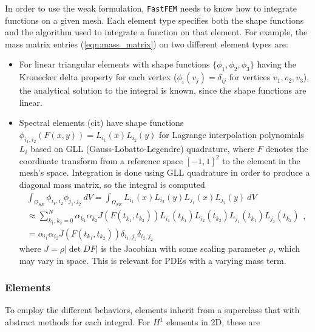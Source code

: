 In order to use the weak formulation, \texttt{FastFEM} needs to know how to integrate functions on a given mesh. Each element type specifies both the shape functions and the algorithm used to integrate a function on that element. For example, the mass matrix entries (\ref{eqn:mass_matrix}) on two different element types are:

\begin{itemize}
\item For linear triangular elements with shape functions $\{\phi_1,\phi_2,\phi_3\}$ having the Kronecker delta property for each vertex ($\phi_i(v_j) = \delta_{ij}$ for vertices $v_1,v_2,v_3$), the analytical solution to the integral is known, since the shape functions are linear.

\item Spectral elements (cit) have shape functions $\phi_{i_1,i_2}(F(x,y)) = L_{i_1}(x)L_{i_2}(y)$ for Lagrange interpolation polynomials $L_i$ based on GLL (Gauss-Lobatto-Legendre) quadrature, where $F$ denotes the coordinate transform from a reference space $[-1,1]^2$ to the element in the mesh's space. Integration is done using GLL quadrature in order to produce a diagonal mass matrix, so the integral is computed
\begin{equation}
\begin{aligned}
    \int_{\Omega_{SE}} \phi_{i_1,i_2}\phi_{j_1,j_2} ~dV = \int_{\Omega_{SE}} L_{i_1}(x)L_{i_2}(y)L_{j_1}(x)L_{j_2}(y) ~dV \\
    \approx \sum_{k_1,k_2=0}^N \alpha_{k_1}\alpha_{k_2} J(F(t_{k_1},t_{k_2}))L_{i_1}(t_{k_1})L_{i_2}(t_{k_2})L_{j_1}(t_{k_1})L_{j_2}(t_{k_2}) \\
    = \alpha_{i_1}\alpha_{i_2}J(F(t_{k_1},t_{k_2}))\delta_{i_1,j_1}\delta_{i_2,j_2}
\end{aligned},
\label{eqn:spectral_mass_matrix}
\end{equation}
where $J = \rho|\det DF|$ is the Jacobian with some scaling parameter $\rho$, which may vary in space. This is relevant for PDEs with a varying mass term.
\end{itemize}


\subsubsection{Elements}
To employ the different behaviors, elements inherit from a superclass that with abstract methods for each integral. For $H^1$ elements in 2D, these are

